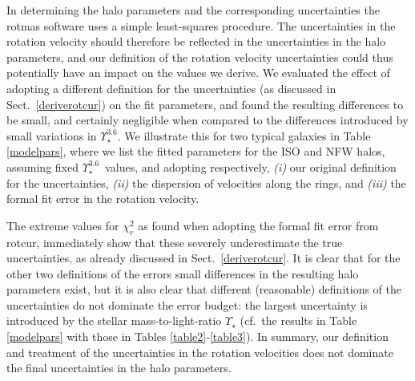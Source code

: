 \documentclass[usenatbib,usegraphicx,apjfonts,floatfix]{emulateapj}
\newcommand{\MLstar}{\ensuremath{\Upsilon_{\star}}}
\newcommand{\Ups}{\ensuremath{\Upsilon_{\star}^{3.6}}}
\begin{document}
In determining the halo parameters and the corresponding uncertainties
the {\sc rotmas} software uses a simple least-squares procedure.  The
uncertainties in the rotation velocity should therefore be reflected
in the uncertainties in the halo parameters, and our definition of the
rotation velocity uncertainties could thus potentially have an impact
on the values we derive. We evaluated the effect of adopting a
different definition for the uncertainties (as discussed in
Sect.~\ref{deriverotcur}) on the fit parameters, and found the
resulting differences to be small, and certainly negligible when
compared to the differences introduced by small variations in \Ups.
We illustrate this for two typical galaxies in Table \ref{modelpars},
where we list the fitted parameters for the ISO and NFW halos,
assuming fixed \Ups\ values, and adopting respectively, \emph{(i)} our
original definition for the uncertainties, \emph{(ii)} the dispersion
of velocities along the rings, and \emph{(iii)} the formal fit error
in the rotation velocity.

The extreme values for $\chi^2_r$ as found when adopting the formal
fit error from {\sc rotcur}, immediately show that these severely
underestimate the true uncertainties, as already discussed in
Sect.~\ref{deriverotcur}. It is clear that for the other two
definitions of the errors small differences in the resulting halo
parameters exist, but it is also clear that different (reasonable)
definitions of the uncertainties do not dominate the error budget: the
largest uncertainty is introduced by the stellar mass-to-light-ratio
$\MLstar$ (cf.\ the results in Table \ref{modelpars} with those in
Tables \ref{table2}-\ref{table3}).  In summary, our definition and
treatment of the uncertainties in the rotation velocities does not
dominate the final uncertainties in the halo parameters.
\end{document}

